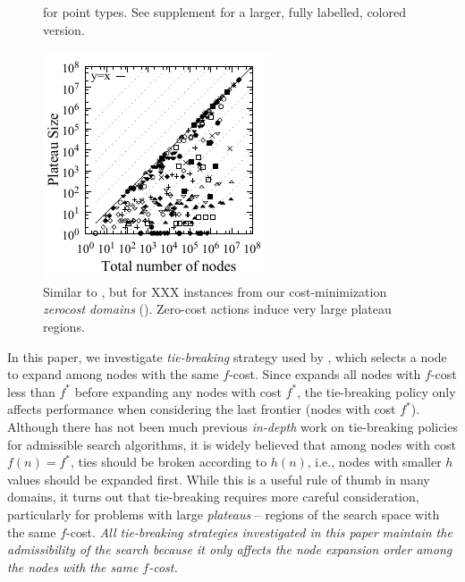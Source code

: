 \begin{figure}[bt]
\begin{minipage}[t]{\minilength}
{  for point types. See supplement for a larger, fully
  labelled, colored version.
  }
  \label{plateau}
 \end{minipage} 
 \hfill
 \begin{minipage}[t]{0.23\textwidth}
  \centering
  \includegraphics{tables/aaai16-frontier/zerocost/lmcut_frontier-front-mono.pdf}
  \caption{Similar to , but for XXX instances from our cost-minimization
  \emph{zerocost domains} ().
  Zero-cost actions induce very large plateau regions.
 }
 \label{plateau-zerocost}
 \end{minipage} 
\end{figure}

In this paper, we investigate \emph{tie-breaking} strategy used by
\astar, which selects a node to expand among nodes with the same
$f$-cost.  Since \astar expands all nodes with $f$-cost less than $f^*$
before expanding any nodes with cost $f^*$, the tie-breaking policy only
affects performance when considering the last frontier (nodes with cost
$f^*$).  Although there has not been much previous \emph{in-depth} work
on tie-breaking policies for admissible search algorithms, it is widely believed that among nodes with
cost $f(n) = f^*$, ties should be broken according to $h(n)$, i.e.,
nodes with smaller $h$ values should be expanded first.  While this is a
useful rule of thumb in many domains, it turns out that tie-breaking
requires more careful consideration, particularly for problems with
large \emph{plateaus} -- regions of the search space with the same $f$-cost.
\emph{All tie-breaking strategies investigated in this paper
maintain the admissibility of the search because it only affects the node expansion
order among the nodes with the same $f$-cost.}

